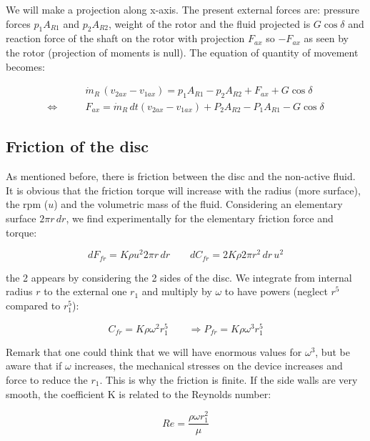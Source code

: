 We will make a projection along x-axis. The present external forces are: pressure forces $p_1A_{R1}$ and $p_2A_{R2}$, weight of the rotor and the fluid projected is $G\cos \delta$ and reaction force of the shaft on the rotor with projection $F_{ax}$ so $-F_{ax}$ as seen by the rotor (projection of moments is null). The equation of quantity of movement becomes: 

\begin{equation}
\begin{aligned}
&\dot{m}_R\, (v_{2ax} - v_{1ax}) = p_1 A_{R1} - p_2 A_{R2} + F_{ax} + G\cos \delta \\
\Leftrightarrow\qquad &F_{ax} = \dot{m}_R\, dt (v_{2ax} - v_{1ax}) + P_2 A_{R2} - P_1 A_{R1} -  G\cos \delta
\end{aligned}
\end{equation}

\subsection{Friction of the disc}
As mentioned before, there is friction between the disc and the non-active fluid. It is obvious that the friction torque will increase with the radius (more surface), the rpm ($u$) and the volumetric mass of the fluid. Considering an elementary surface $2\pi r\, dr$, we find experimentally for the elementary friction force and torque: 

\begin{equation}
dF_{fr} = K\rho u^2 2\pi r \,dr \qquad dC_{fr} = 2K\rho 2\pi r^2\, dr\, u^2 
\end{equation}

the 2 appears by considering the 2 sides of the disc. We integrate from internal radius $r$ to the external one $r_1$ and multiply by $\omega$ to have powers (neglect $r^5$ compared to $r_1^5$): 

\begin{equation}
C_{fr} = K\rho \omega ^2 r_1^5 \qquad \Rightarrow P_{fr}= K\rho \omega ^3 r_1^5
\end{equation}

Remark that one could think that we will have enormous values for $\omega ^3$, but be aware that if $\omega$ increases, the mechanical stresses on the device increases and force to reduce the $r_1$. This is why the friction is finite. If the side walls are very smooth, the coefficient K is related to the Reynolds number: 

\begin{equation}
Re = \frac{\rho \omega r_1^2}{\mu}
\end{equation}

